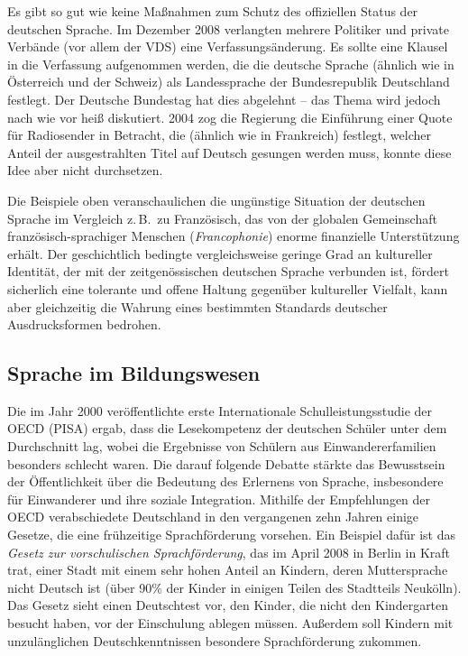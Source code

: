 \begin{multicols}{2}
Es gibt so gut wie keine Maßnahmen zum Schutz des offiziellen Status der deutschen Sprache. Im Dezember 2008 verlangten mehrere Politiker und private Verbände (vor allem der VDS) eine Verfassungsänderung. Es sollte eine Klausel in die Verfassung aufgenommen werden, die die deutsche Sprache (ähnlich wie in Österreich und der Schweiz) als Landessprache der Bundesrepublik Deutschland festlegt. Der Deutsche Bundestag hat dies abgelehnt -- das Thema wird jedoch nach wie vor heiß diskutiert. 2004 zog die Regierung die Einführung einer Quote für Radiosender in Betracht, die (ähnlich wie in Frankreich) festlegt, welcher Anteil der ausgestrahlten Titel auf Deutsch gesungen werden muss, konnte diese Idee aber nicht durchsetzen.

Die Beispiele oben veranschaulichen die ungünstige Situation der deutschen Sprache im Vergleich z.\,B.~zu Französisch, das von der globalen Gemeinschaft fran\-zö\-sisch-sprachiger Menschen (\textit{Francophonie}) enorme finanzielle Unterstützung erhält. Der geschichtlich bedingte vergleichsweise geringe Grad an kultureller Identität, der mit der zeitgenössischen deutschen Sprache verbunden ist, fördert sicherlich eine tolerante und offene Haltung gegenüber kultureller Vielfalt, kann aber gleichzeitig die Wahrung eines bestimmten Standards deutscher Ausdrucksformen bedrohen.

\subsection{Sprache im Bildungswesen}

Die im Jahr 2000 veröffentlichte erste Internationale Schulleistungsstudie der OECD (PISA) ergab, dass die Lesekompetenz der deutschen Schüler unter dem Durchschnitt lag, wobei die Ergebnisse von Schülern aus Einwandererfamilien besonders schlecht waren. Die darauf folgende Debatte stärkte das Bewusstsein der Öffentlichkeit über die Bedeutung des Erlernens von Sprache, insbesondere für Einwanderer und ihre soziale Integration. Mithilfe der Empfehlungen der OECD verabschiedete Deutschland in den vergangenen zehn Jahren einige Gesetze, die eine frühzeitige Sprachförderung vorsehen. Ein Beispiel dafür ist das \textit{Gesetz zur vorschulischen Sprachförderung}, das im April 2008 in Berlin in Kraft trat, einer Stadt mit einem sehr hohen Anteil an Kindern, deren Muttersprache nicht Deutsch ist (über 90\% der Kinder in einigen Teilen des Stadtteils Neukölln). Das Gesetz sieht einen Deutschtest vor, den Kinder, die nicht den Kindergarten besucht haben, vor der Einschulung ablegen müssen. Außerdem soll Kindern mit unzulänglichen Deutschkenntnissen besondere Sprachförderung zukommen.


\end{multicols}
